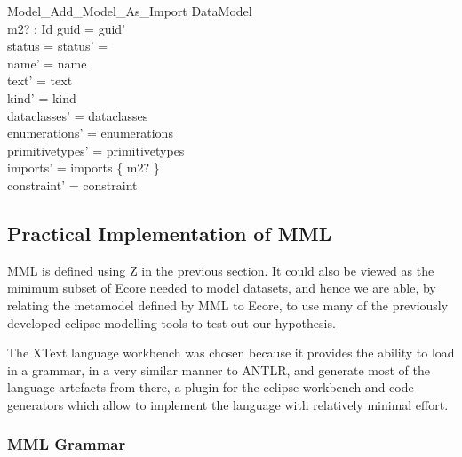 \documentclass[a4paper,twoside]{article}
\def\draft{\mathsf{draft}}
\begin{document}
\begin{schema}{Model\_Add\_Model\_As\_Import}
	\Delta DataModel \\
	m2? : Id 
	\where
	guid = guid' \\
	status = status' = \draft \\
	name' = name \\
	text' = text \\
	kind' = kind \\
	dataclasses' = dataclasses \\
	enumerations' = enumerations \\
	primitivetypes' = primitivetypes \\
	imports' = imports \cup \{ m2? \} \\
	constraint' = constraint
\end{schema}


\subsection{Practical Implementation of MML}
MML is defined using Z in the previous section. It could also be viewed as the minimum subset of Ecore needed to model datasets, and hence we are able, by relating the metamodel defined by MML to Ecore, to use many of the previously developed eclipse modelling tools to test out our hypothesis.

 The XText language workbench was chosen because it provides the ability to load in a grammar, in a very similar manner to ANTLR, and generate most of the language artefacts from there, a plugin for the eclipse workbench and code generators which allow to implement the language with relatively minimal effort.

\subsubsection{MML Grammar}
\end{document}
